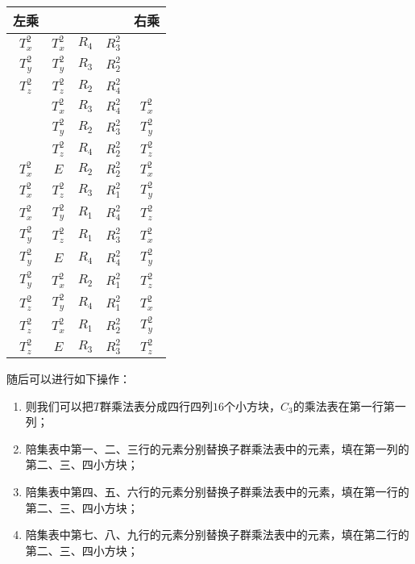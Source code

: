 \documentclass[reqno,a4paper,12pt]{amsart}
\begin{document}
\begin{enumerate}[1.]
\begin{tcolorbox}[breakable, colback = black!5!white, colframe = black]
\begin{table}[H]
\centering
\begin{tabular}{|c|c|c|c|c|}
	\hline
	左乘 & \makebox[0.12\textwidth][c]{$E$} & \makebox[0.12\textwidth][c]{$R_1$} & \makebox[0.12\textwidth][c]{$R_1^2$} & 右乘 \\ 
	\hline
	$T_x^2$ & $T_x^2$ & $R_4$ & $R_3^2$ &  \\
	\hline 
	$T_y^2$ & $T_y^2$ & $R_3$ & $R_2^2$ &  \\
	\hline 
	$T_z^2$ & $T_z^2$ & $R_2$ & $R_4^2$ &  \\
	\hline
	 & $T_x^2$ & $R_3$ & $R_4^2$ & $T_x^2$ \\
	\hline
	 & $T_y^2$ & $R_2$ & $R_3^2$ & $T_y^2$ \\
	\hline
	 & $T_z^2$ & $R_4$ & $R_2^2$ & $T_z^2$ \\
	\hline
	$T_x^2$ & $E$ & $R_2$ & $R_2^2$ & $T_x^2$ \\
	\hline 
	$T_x^2$ & $T_z^2$ & $R_3$ & $R_1^2$ & $T_y^2$ \\
	\hline 
	$T_x^2$ & $T_y^2$ & $R_1$ & $R_4^2$ & $T_z^2$ \\
	\hline 
	$T_y^2$ & $T_z^2$ & $R_1$ & $R_3^2$ & $T_x^2$ \\
	\hline 
	$T_y^2$ & $E$ & $R_4$ & $R_4^2$ & $T_y^2$ \\
	\hline 
	$T_y^2$ & $T_x^2$ & $R_2$ & $R_1^2$ & $T_z^2$ \\
	\hline 
	$T_z^2$ & $T_y^2$ & $R_4$ & $R_1^2$ & $T_x^2$ \\
	\hline 
	$T_z^2$ & $T_x^2$ & $R_1$ & $R_2^2$ & $T_y^2$ \\
	\hline 
	$T_z^2$ & $E$ & $R_3$ & $R_3^2$ & $T_z^2$ \\
	\hline 
\end{tabular}%
\end{table}
随后可以进行如下操作：
\begin{enumerate}[(1)]
\item 则我们可以把$T$群乘法表分成四行四列$16$个小方块，$C_3$的乘法表在第一行第一列；

\item 陪集表中第一、二、三行的元素分别替换子群乘法表中的元素，填在第一列的第二、三、四小方块；

\item 陪集表中第四、五、六行的元素分别替换子群乘法表中的元素，填在第一行的第二、三、四小方块；

\item 陪集表中第七、八、九行的元素分别替换子群乘法表中的元素，填在第二行的第二、三、四小方块；


\end{enumerate}
\end{tcolorbox}
\end{enumerate}
\end{document}
